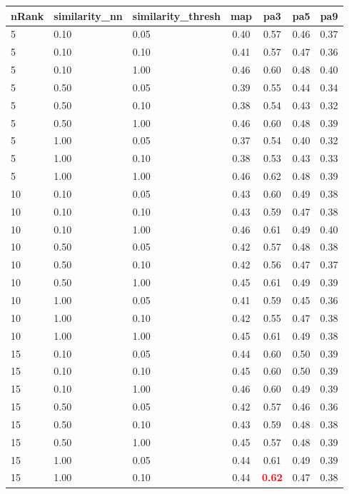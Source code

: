   
\begin{table} 
\begin{center} 
\scriptsize 
 \setlength{\tabcolsep}{.16667em} 
\begin{tabular}{lllcccc} 
nRank & similarity\_nn & similarity\_thresh & map & pa3 & pa5 & pa9 \\ 
\hline 
 5 & 0.10 & 0.05 & 0.40 & 0.57 & 0.46 & 0.37 \\ 
 5 & 0.10 & 0.10 & 0.41 & 0.57 & 0.47 & 0.36 \\ 
 5 & 0.10 & 1.00 & 0.46 & 0.60 & 0.48 & 0.40 \\ 
 5 & 0.50 & 0.05 & 0.39 & 0.55 & 0.44 & 0.34 \\ 
 5 & 0.50 & 0.10 & 0.38 & 0.54 & 0.43 & 0.32 \\ 
 5 & 0.50 & 1.00 & 0.46 & 0.60 & 0.48 & 0.39 \\ 
 5 & 1.00 & 0.05 & 0.37 & 0.54 & 0.40 & 0.32 \\ 
 5 & 1.00 & 0.10 & 0.38 & 0.53 & 0.43 & 0.33 \\ 
 5 & 1.00 & 1.00 & 0.46 & 0.62 & 0.48 & 0.39 \\ 
10 & 0.10 & 0.05 & 0.43 & 0.60 & 0.49 & 0.38 \\ 
10 & 0.10 & 0.10 & 0.43 & 0.59 & 0.47 & 0.38 \\ 
10 & 0.10 & 1.00 & 0.46 & 0.61 & 0.49 & 0.40 \\ 
10 & 0.50 & 0.05 & 0.42 & 0.57 & 0.48 & 0.38 \\ 
10 & 0.50 & 0.10 & 0.42 & 0.56 & 0.47 & 0.37 \\ 
10 & 0.50 & 1.00 & 0.45 & 0.61 & 0.49 & 0.39 \\ 
10 & 1.00 & 0.05 & 0.41 & 0.59 & 0.45 & 0.36 \\ 
10 & 1.00 & 0.10 & 0.42 & 0.55 & 0.47 & 0.38 \\ 
10 & 1.00 & 1.00 & 0.45 & 0.61 & 0.49 & 0.38 \\ 
15 & 0.10 & 0.05 & 0.44 & 0.60 & 0.50 & 0.39 \\ 
15 & 0.10 & 0.10 & 0.45 & 0.60 & 0.50 & 0.39 \\ 
15 & 0.10 & 1.00 & 0.46 & 0.60 & 0.49 & 0.39 \\ 
15 & 0.50 & 0.05 & 0.42 & 0.57 & 0.46 & 0.36 \\ 
15 & 0.50 & 0.10 & 0.43 & 0.59 & 0.48 & 0.38 \\ 
15 & 0.50 & 1.00 & 0.45 & 0.57 & 0.48 & 0.39 \\ 
15 & 1.00 & 0.05 & 0.44 & 0.61 & 0.49 & 0.39 \\ 
15 & 1.00 & 0.10 & 0.44 & \textbf{\textcolor{red}{0.62}} & 0.47 & 0.38 \\ 

\end{tabular}
\end{center}
\end{table}
